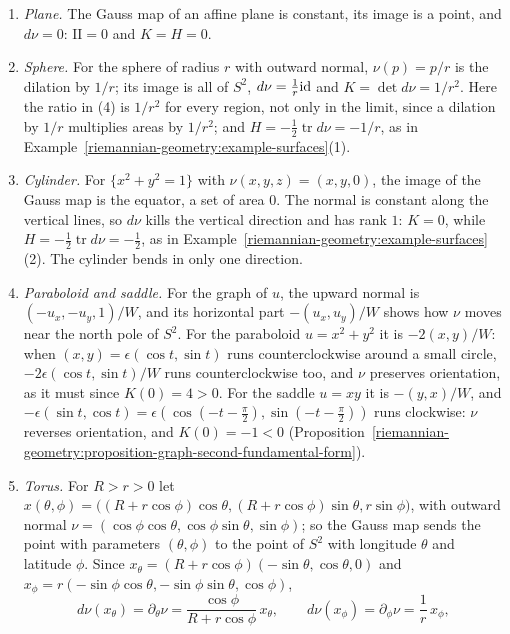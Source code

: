 \begin{example}\label{riemannian-geometry:example-gauss-map}
\begin{enumerate}
\item \emph{Plane.} The Gauss map of an affine plane is constant, its image is a point, and $d\nu = 0$: $\mathrm{II} = 0$ and $K = H = 0$.
\item \emph{Sphere.} For the sphere of radius $r$ with outward normal, $\nu(p) = p/r$ is the dilation by $1/r$; its image is all of $S^2$, $d\nu = \frac1r\mathrm{id}$ and $K = \det d\nu = 1/r^2$. Here the ratio in
(4) is $1/r^2$ for every region, not only in the limit, since a dilation by $1/r$ multiplies areas by $1/r^2$; and $H = -\frac12\operatorname{tr}d\nu = -1/r$, as in Example~\ref{riemannian-geometry:example-surfaces}(1).
\item \emph{Cylinder.} For $\{x^2 + y^2 = 1\}$ with $\nu(x, y, z) = (x, y, 0)$, the image of the Gauss map is the equator, a set of area $0$. The normal is constant along the vertical lines, so $d\nu$ kills
the vertical direction and has rank $1$: $K = 0$, while $H = -\frac12\operatorname{tr}d\nu = -\frac12$, as in Example~\ref{riemannian-geometry:example-surfaces}(2). The cylinder bends in only one direction.
\item \emph{Paraboloid and saddle.} For the graph of $u$, the upward normal is $(-u_x, -u_y, 1)/W$, and its horizontal part $-(u_x, u_y)/W$ shows how $\nu$ moves near the north pole of $S^2$. For the
paraboloid $u = x^2 + y^2$ it is $-2(x, y)/W$: when $(x, y) = \epsilon(\cos t, \sin t)$ runs counterclockwise around a small circle, $-2\epsilon(\cos t, \sin t)/W$ runs counterclockwise too, and $\nu$
preserves orientation, as it must since $K(0) = 4 > 0$. For the saddle $u = xy$ it is $-(y, x)/W$, and $-\epsilon(\sin t, \cos t) = \epsilon(\cos(-t - \frac\pi2), \sin(-t - \frac\pi2))$ runs clockwise: $\nu$
reverses orientation, and $K(0) = -1 < 0$ (Proposition~\ref{riemannian-geometry:proposition-graph-second-fundamental-form}).
\item \emph{Torus.} For $R > r > 0$ let $x(\theta, \phi) = \bigl((R + r\cos\phi)\cos\theta, (R + r\cos\phi)\sin\theta, r\sin\phi\bigr)$, with outward normal
$\nu = (\cos\phi\cos\theta, \cos\phi\sin\theta, \sin\phi)$; so the Gauss map sends the point with parameters $(\theta, \phi)$ to the point of $S^2$ with longitude $\theta$ and latitude $\phi$. Since
$x_\theta = (R + r\cos\phi)(-\sin\theta, \cos\theta, 0)$ and $x_\phi = r(-\sin\phi\cos\theta, -\sin\phi\sin\theta, \cos\phi)$,
\[
d\nu(x_\theta) = \partial_\theta\nu = \frac{\cos\phi}{R + r\cos\phi}\,x_\theta, \qquad d\nu(x_\phi) = \partial_\phi\nu = \frac1r\,x_\phi ,
\]
\end{enumerate}
\end{example}
